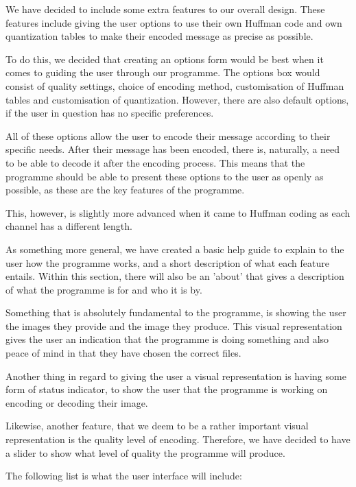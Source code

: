 We have decided to include some extra features to our overall design.
These features include giving the user options to use their own Huffman code and own quantization tables to make their encoded message as precise as possible.

To do this, we decided that creating an options form would be best when it comes to guiding the user through our programme.
The options box would consist of quality settings, choice of encoding method, customisation of Huffman tables and customisation of quantization.
However, there are also default options, if the user in question has no specific preferences.

All of these options allow the user to encode their message according to their specific needs.
After their message has been encoded, there is, naturally, a need to be able to decode it after the encoding process.
This means that the programme should be able to present these options to the user as openly as possible, as these are the key features of the programme.

This, however, is slightly more advanced when it came to Huffman coding as each channel has a different length.

As something more general, we have created a basic help guide to explain to the user how the programme works, and a short description of what each feature entails.
Within this section, there will also be an 'about' that gives a description of what the programme is for and who it is by.

Something that is absolutely fundamental to the programme, is showing the user the images they provide and the image they produce.
This visual representation gives the user an indication that the programme is doing something and also peace of mind in that they have chosen the correct files.

Another thing in regard to giving the user a visual representation is having some form of status indicator, to show the user that the programme is working on encoding or decoding their image.

Likewise, another feature, that we deem to be a rather important visual representation is the quality level of encoding.
Therefore, we have decided to have a slider to show what level of quality the programme will produce.

The following list is what the user interface will include:

